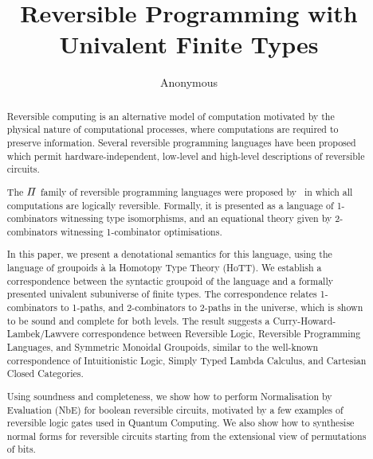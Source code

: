 \documentclass[acmsmall,review,anonymous]{acmart}
\begin{document}
\title{Reversible Programming with Univalent Finite Types}

\author{Anonymous}

\renewcommand{\shortauthors}{Anonymous}

\begin{abstract}
Reversible computing is an alternative model of computation motivated by the physical nature of computational processes, where computations are required to preserve information. Several reversible programming languages have been proposed which permit hardware-independent, low-level and high-level descriptions of reversible circuits.

The $\mathit{\Pi}$ family of reversible programming languages were proposed by~\citet{jamesInformationEffects2012} in which all computations are logically reversible. Formally, it is presented as a language of 1-combinators witnessing type isomorphisms, and an equational theory given by 2-combinators witnessing 1-combinator optimisations.

In this paper, we present a denotational semantics for this language, using the language of groupoids \`{a} la Homotopy Type Theory (HoTT). We establish a correspondence between the syntactic groupoid of the language and a formally presented univalent subuniverse of finite types. The correspondence relates 1-combinators to 1-paths, and 2-combinators to 2-paths in the universe, which is shown to be sound and complete for both levels. The result suggests a Curry-Howard-Lambek/Lawvere correspondence between Reversible Logic, Reversible Programming Languages, and Symmetric Monoidal Groupoids, similar to the well-known correspondence of Intuitionistic Logic, Simply Typed Lambda Calculus, and Cartesian Closed Categories.

Using soundness and completeness, we show how to perform Normalisation by Evaluation (NbE) for boolean reversible circuits, motivated by a few examples of reversible logic gates used in Quantum Computing. We also show how to synthesise normal forms for reversible circuits starting from the extensional view of permutations of bits.
\end{abstract}
\end{document}
